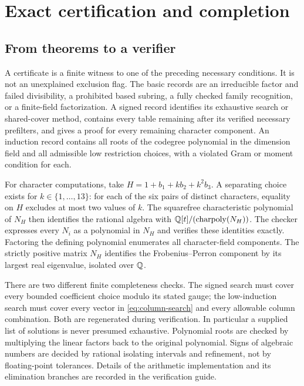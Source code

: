 \section{Exact certification and completion}\label{sec:finite-certification}
\subsection{From theorems to a verifier}
A certificate is a finite witness to one of the preceding necessary
conditions. It is not an unexplained exclusion flag. The basic records are
an irreducible factor and failed divisibility, a prohibited based subring,
a fully checked family recognition, or a finite-field factorization. A
signed record identifies its exhaustive search or shared-cover method,
contains every table remaining after its verified necessary prefilters,
and gives a proof for every remaining character component. An induction record contains all roots of
the codegree polynomial in the dimension field and all admissible low
restriction choices, with a violated Gram or moment condition for each.

For character computations, take
$H=1+b_1+kb_2+k^2b_3$. A separating choice exists for $k\in\{1,\ldots,13\}$:
for each of the six pairs of distinct characters, equality on $H$ excludes
at most two values of $k$. The squarefree characteristic polynomial of
$N_H$ then identifies the rational algebra with
$\mathbb Q[t]/(\operatorname{charpoly}(N_H))$. The checker expresses every $N_i$
as a polynomial in $N_H$ and verifies these identities exactly. Factoring
the defining polynomial enumerates all character-field components. The
strictly positive matrix $N_H$ identifies the Frobenius--Perron component
by its largest real eigenvalue, isolated over $\mathbb Q$.

There are two different finite completeness checks. The signed search
must cover every bounded coefficient choice modulo its stated gauge; the
low-induction search must cover every vector in
\eqref{eq:column-search} and every allowable column combination. Both are
regenerated during verification. In particular a supplied list of solutions
is never presumed exhaustive. Polynomial roots are checked by multiplying
the linear factors back to the original polynomial. Signs of algebraic
numbers are decided by rational isolating intervals and refinement, not by
floating-point tolerances. Details of the arithmetic implementation and
its elimination branches are recorded in the verification guide.


